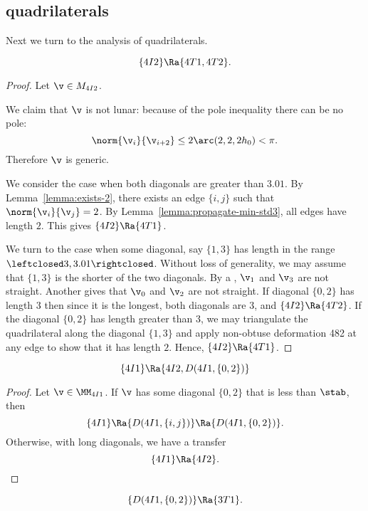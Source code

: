 \subsection{quadrilaterals}

Next we turn to the analysis of quadrilaterals.

\begin{lemma}[]
\[
\{4I2\}\Ra \{4T1,4T2\}.
\]
\end{lemma}

\begin{proof}
Let $\v\in M_{4I2}$.

We claim that $\v$ is not lunar: because of the pole inequality there can be no pole:
\[
\norm{\v_i}{\v_{i+2}} \le 2 \arc(2,2,2h_0) < \pi.
\]
Therefore $\v$ is generic.

We consider the case when both diagonals are greater than $3.01$.
By Lemma~\ref{lemma:exists-2}, there exists an edge $\{i,j\}$ such that $\norm{\v_i}{\v_j}=2$.
By Lemma~\ref{lemma:propagate-min-std3}, all edges have length $2$.  This gives $\{4I2\}\Ra\{4T1\}$.

We turn to the case when some diagonal, say $\{1,3\}$ has length in the range $\leftclosed 3,3.01\rightclosed$.
Without loss of generality, we may assume that $\{1,3\}$ is the shorter of the two diagonals.
By a , $\v_1$ and $\v_3$ are not straight.  Another  gives that $\v_0$ and $\v_2$
are not straight.
If diagonal $\{0,2\}$ has length $3$ then since it is the longest, both diagonals are $3$, and $\{4I2\}\Ra\{4T2\}$.
If the diagonal $\{0,2\}$ has length greater than $3$, we may triangulate the quadrilateral along the diagonal
$\{1,3\}$ and apply non-obtuse deformation 482 at any edge to show that it has length $2$.  Hence,
$\{4I2\}\Ra\{4T1\}$.
\end{proof}

\begin{lemma}[]
\[
\{4I1\}\Ra \{4I2,D(4I1,\{0,2\})\}
\]
\end{lemma}

\begin{proof}  Let $\v\in \MM_{4I1}$.  If $\v$ has some diagonal $\{0,2\}$ that is less than $\stab$,
then
\[
\{4I1\}\Ra\{D(4I1,\{i,j\})\}\Ra\{D(4I1,\{0,2\})\}.
\]
Otherwise, with long diagonals, we have a transfer
\[
\{4I1\}\Ra \{4I2\}.
\]
\end{proof}

\begin{lemma}[]
\[
\{D(4I1,\{0,2\})\}\Ra \{3T1\}.
\]
\end{lemma}

